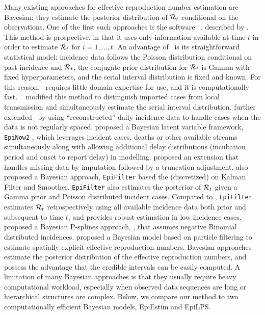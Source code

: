 Many existing approaches for effective reproduction number estimation are
Bayesian: they estimate the posterior distribution of $\mathcal{R}_t$ conditional on
the observations. One of the first such approaches is the software \EpiEstim\
\citep{cori2020package}, described by \citet{cori2013new}. This method is
prospective, in that it uses only information available at time $t$ in order to
estimate $\mathcal{R}_t$ for $i = 1,\ldots, t$. An advantage of \EpiEstim\ is its
straightforward statistical model: incidence data follows the Poisson
distribution conditional on past incidence and $\mathcal{R}_t$, the conjugate prior
distribution for $\mathcal{R}_t$ is Gamma with fixed hyperparameters, and the serial
interval distribution is fixed and known. For this reason, \EpiEstim\ requires
little domain expertise for use, and it is computationally fast. \
\citet{thompson2019improved} modified this method to distinguish imported cases from local transmission and
simultaneously estimate the serial interval distribution.
\citet{nash2023estimating} further extended \EpiEstim\ by using
``reconstructed'' daily incidence data to handle cases when the data is not
regularly spaced.
% 
\cite{abbott2020estimating} proposed a Bayesian latent variable framework,
\texttt{EpiNow2} \citep{EpiNow2}, which leverages incident cases, deaths or
other available streams simultaneously along with allowing additional delay
distributions (incubation period and onset to report delay) in modelling.  
\citet{lison2023generative} proposed an extension that handles missing data by
imputation followed by a truncation adjustment. 
%
\citet{parag2021improved} also proposed a Bayesian approach, \texttt{EpiFilter}
based the (discretized) on Kalman Filter and Smoother. \texttt{EpiFilter} also
estimates the posterior of $\mathcal{R}_t$ given a Gamma prior and Poisson distributed
incident cases. Compared to \EpiEstim, \texttt{EpiFilter} estimates $\mathcal{R}_t$
retrospectively using all available incidence data both prior and subsequent to
time $t$, and provides robust estimation in low incidence cases.  
\citet{gressani2022epilps} proposed a Bayesian P-splines approach, \EpiLPS, that
assumes negative Binomial distributed incidences. \citet{trevisin2023spatially}
proposed a Bayesian model based on particle filtering to estimate spatially
explicit effective reproduction numbers.
%
Bayesian approaches estimate the posterior distribution of the effective
reproduction numbers, and possess the advantage that the credible intervals can
be easily computed. A limitation of many Bayesian approaches is that they
usually require heavy computational workload, especially when observed data
sequences are long or hierarchical structures are complex.  Below, we compare
our method to two computationally efficient Bayesian models, EpiEstim and
EpiLPS. 

